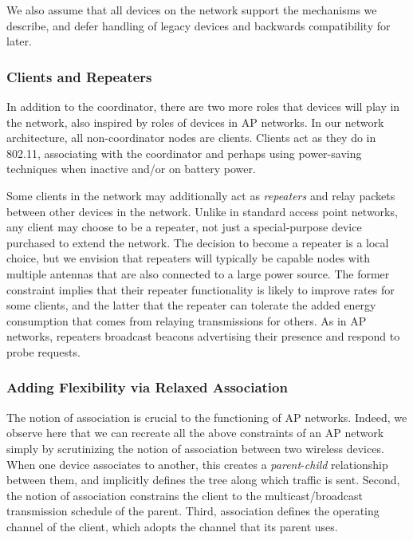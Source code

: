 We also assume that all devices on the network support the mechanisms we describe, and defer handling of legacy devices and backwards compatibility for later.

\subsubsection{Clients and Repeaters}
In addition to the coordinator, there are two more roles that devices will play in the network, also inspired by roles of devices in AP networks. In our network architecture, all non-coordinator nodes are clients. Clients act as they do in 802.11, associating with the coordinator and perhaps using power-saving techniques when inactive and/or on battery power.

Some clients in the network may additionally act as \emph{repeaters} and relay packets between other devices in the network. Unlike in standard access point networks, any client may choose to be a repeater, not just a special-purpose device purchased to extend the network. The decision to become a repeater is a local choice, but we envision that repeaters will typically be capable nodes with multiple antennas that are also connected to a large power source. The former constraint implies that their repeater functionality is likely to improve rates for some clients, and the latter that the repeater can tolerate the added energy consumption that comes from relaying transmissions for others. As in AP networks, repeaters broadcast beacons advertising their presence and respond to probe requests.

\subsubsection{Adding Flexibility via Relaxed Association}
The notion of association is crucial to the functioning of AP networks. Indeed, we observe here that we can recreate all the above constraints of an AP network simply by scrutinizing the notion of association between two wireless devices. When one device associates to another, this creates a \emph{parent}-\emph{child} relationship between them, and implicitly defines the tree along which traffic is sent. Second, the notion of association constrains the client to the multicast/broadcast transmission schedule of the parent. Third, association defines the operating channel of the client, which adopts the channel that its parent uses.

